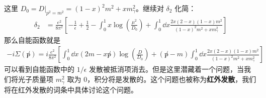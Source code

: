 这里 $D_0 = D|_{p^2=m^2}=(1-x)^2 m^2+x m_\gamma^2 $。继续对 $\delta_2$ 化简：
\begin{equation}
\begin{aligned}
\delta_2 &= \frac{e^2}{8\pi^2}\left[-\frac{1}{\epsilon}+\frac{1}{2}-\int_0^1 x\log\left(\frac{\mu^2}{D_0} \right) 
+\int_0^1\dd{x} \frac{2x(2-x)(1-x)m^2}{(1-x)^2m^2+xm_\gamma^2}
\right]
\end{aligned}
\end{equation}
那么自能函数就是
\begin{equation}
\begin{aligned}
-i\Sigma(\not p)=i\frac{e^2}{8\pi^2}\left[\int_0^1\dd x(2m-x\not p)\log\left(\frac{D}{D_0}\right)+(\not p-m)\int_0^1\dd{x}\frac{2x(2-x)(1-x)m^2}{(1-x)^2m^2+xm_\gamma^2} \right]
\end{aligned}
\end{equation}
可以看到自能函数中的 $1/\epsilon$ 发散被抵消项消去。但是这里潜藏着一个问题，当我们将光子质量项 $m_\gamma^2$ 取为 $0$，积分将是发散的。这个问题也被称为\textbf{红外发散}，我们将在红外发散的词条中具体讨论这个问题。

